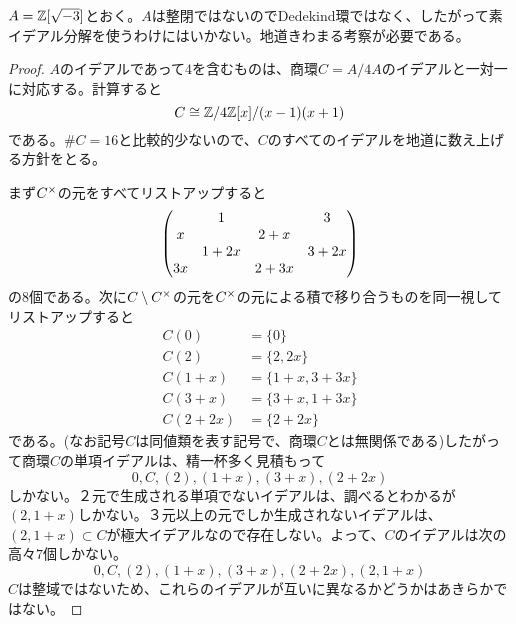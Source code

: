 \subsubsection{}%
\begin{rem}
  $A = {\mathbb Z}[\sqrt{-3}]$とおく。$A$は整閉ではないのでDedekind環ではなく、したがって素イデアル分解を使うわけにはいかない。地道きわまる考察が必要である。
\end{rem}
\begin{proof}
$A$のイデアルであって$4$を含むものは、商環$C = A/4A$のイデアルと一対一に対応する。計算すると
\[
C \cong {\mathbb Z} / 4{\mathbb Z} [x] /(x-1)(x+1)
\]
である。$\# C = 16$と比較的少ないので、$C$のすべてのイデアルを地道に数え上げる方針をとる。

まず$C^{\times}$の元をすべてリストアップすると
\[
\begin{pmatrix} 
{}  & 1  & {} & 3  \\
 x & {} & 2+x & { } \\
{}  & 1+2x & {} & 3 + 2x \\
 3x & { } & 2+3x & {}
 \end{pmatrix}
\]
の$8$個である。次に$C \setminus C^{\times}$の元を$C^{\times}$の元による積で移り合うものを同一視してリストアップすると
\begin{align*}
  C(0) &= \{ 0 \} \\
  C(2) &= \{ 2 ,2x \} \\
  C(1+x) &= \{ 1+x, 3+3x \} \\
  C(3+x)  &= \{3+x, 1+3x \} \\
  C(2+2x)  &= \{2 + 2x \}
\end{align*}
である。(なお記号$C$は同値類を表す記号で、商環$C$とは無関係である)したがって商環$C$の単項イデアルは、精一杯多く見積もって
\[
0, C , (2) , (1+x), (3+x), (2+2x)
\]
しかない。２元で生成される単項でないイデアルは、調べるとわかるが$(2,1+x)$しかない。３元以上の元でしか生成されないイデアルは、$(2,1+x) \subset C$が極大イデアルなので存在しない。よって、$C$のイデアルは次の高々$7$個しかない。
\[
0, C , (2) , (1+x), (3+x), (2+2x), (2,1+x)
\]
$C$は整域ではないため、これらのイデアルが互いに異なるかどうかはあきらかではない。


\end{proof}
